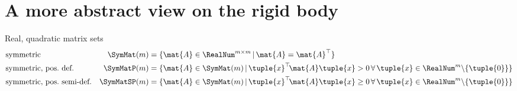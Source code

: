 \section{A more abstract view on the rigid body}\label{sec:RBSMath}
Real, quadratic matrix sets
\begin{subequations}
\begin{align*}
 &\text{symmetric}&
 \SymMat(m) &= \{ \mat{A} \in \RealNum^{m\times m} \, | \, \mat{A} = \mat{A}^\top \}
\\
 &\text{symmetric, pos.\ def.}&
 \SymMatP(m) &= \{ \mat{A} \in \SymMat(m) \, | \, \tuple{x}^\top\! \mat{A} \tuple{x} > 0 \, \forall \, \tuple{x} \in \RealNum^{m} \backslash \{\tuple{0}\} \}
\\
 &\text{symmetric, pos.\ semi-def.}&
 \SymMatSP(m) &= \{ \mat{A} \in \SymMat(m) \, | \, \tuple{x}^\top\! \mat{A} \tuple{x} \geq 0 \, \forall \, \tuple{x} \in \RealNum^{m} \backslash \{\tuple{0}\} \}
\end{align*} 
\end{subequations}

